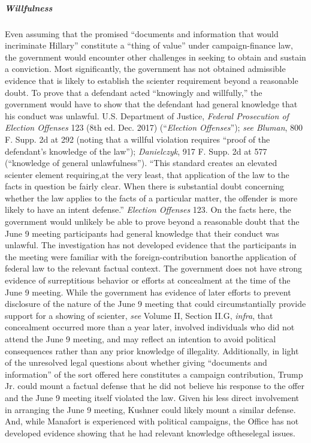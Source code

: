 \subparagraph{Willfulness}
Even assuming that the promised ``documents and information that would incriminate Hillary'' constitute a ``thing of value'' under campaign-finance law, the government would encounter other challenges in seeking to obtain and sustain a conviction.
Most significantly, the government has not obtained admissible evidence that is likely to establish the scienter requirement beyond a reasonable doubt.
To prove that a defendant acted ``knowingly and willfully,'' the government would have to show that the defendant had general knowledge that his conduct was unlawful.
U.S. Department of Justice, \textit{Federal Prosecution of Election Offenses} 123 (8th ed. Dec. 2017) (``\textit{Election Offenses}''); \textit{see Bluman}, 800 F. Supp. 2d at 292 (noting that a willful violation requires ``proof of the defendant's knowledge of the law''); \textit{Danielczyk}, 917 F. Supp. 2d at 577 (``knowledge of general unlawfulness'').
``This standard creates an elevated scienter element requiring,at the very least, that application of the law to the facts in question be fairly clear.
When there is substantial doubt concerning whether the law applies to the facts of a particular matter, the offender is more likely to have an intent defense.''
\textit{Election Offenses} 123.
On the facts here, the government would unlikely be able to prove beyond a reasonable doubt that the June 9 meeting participants had general knowledge that their conduct was unlawful.
The investigation has not developed evidence that the participants in the meeting were familiar with the foreign-contribution banorthe application of federal law to the relevant factual context.
The government does not have strong evidence of surreptitious behavior or efforts at concealment at the time of the June 9 meeting.
While the government has evidence of later efforts to prevent disclosure of the nature of the June 9 meeting that could circumstantially provide support for a showing of scienter, \textit{see} Volume II, Section II.G, \textit{infra}, that concealment occurred more than a year later, involved individuals who did not attend the June 9 meeting, and may reflect an intention to avoid political consequences rather than any prior knowledge of illegality.
Additionally, in light of the unresolved legal questions about whether giving ``documents and information'' of the sort offered here constitutes a campaign contribution, Trump Jr. could mount a factual defense that he did not believe his response to the offer and the June 9 meeting itself violated the law.
Given his less direct involvement in arranging the June 9 meeting, Kushner could likely mount a similar defense.
And, while Manafort is experienced with political campaigns, the Office has not developed evidence showing that he had relevant knowledge oftheselegal issues.

